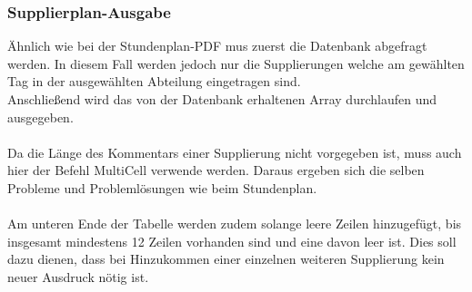 


\subsubsection{Supplierplan-Ausgabe}

Ähnlich wie bei der Stundenplan-PDF mus zuerst die Datenbank abgefragt werden. In diesem Fall werden jedoch nur die Supplierungen welche am gewählten Tag in der ausgewählten Abteilung eingetragen sind.\\
Anschließend wird das von der Datenbank erhaltenen Array durchlaufen und ausgegeben.\\\\
Da die Länge des Kommentars einer Supplierung nicht vorgegeben ist, muss auch hier der Befehl MultiCell verwende werden. Daraus ergeben sich die selben Probleme und Problemlösungen wie beim Stundenplan.\\\\
Am unteren Ende der Tabelle werden zudem solange leere Zeilen hinzugefügt, bis insgesamt mindestens 12 Zeilen vorhanden sind und eine davon leer ist. Dies soll dazu dienen, dass bei Hinzukommen einer einzelnen weiteren Supplierung kein neuer Ausdruck nötig ist.